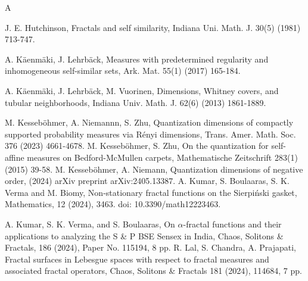 \documentclass{amsproc}
\theoremstyle{definition}
\theoremstyle{remark}
\numberwithin{equation}{section}
\begin{document}
\begin{thebibliography}{A}
 
 J. E. Hutchinson, Fractals and self similarity, Indiana Uni. Math. J. 30(5) (1981) 713-747.
 
   A. K\"aenm\"aki, J. Lehrb\"ack, Measures with predetermined regularity and inhomogeneous self-similar sets, Ark. Mat. 55(1) (2017) 165-184.

   A. Käenmäki, J. Lehrbäck, M. Vuorinen, Dimensions, Whitney covers, and tubular neighborhoods, Indiana Univ. Math. J. 62(6) (2013) 1861-1889. 
  
 
 M. Kesseböhmer, A. Niemannn, S. Zhu, 
Quantization dimensions of compactly supported probability measures via R\'enyi dimensions,
Trans. Amer. Math. Soc. 376 (2023) 4661-4678.
 M. Kesseböhmer, S. Zhu,
On the quantization for self-affine measures on Bedford-McMullen carpets,
Mathematische Zeitschrift  283(1) (2015) 39-58.
 M. Kesseböhmer, A. Niemann, Quantization dimensions of negative order, (2024) arXiv preprint arXiv:2405.13387.
  A. Kumar, S. Boulaaras, S. K. Verma and M. Biomy, Non-stationary fractal functions on the Sierpi\'nski gasket, Mathematics, 12 (2024), 3463. doi: 10.3390/math12223463.

  A. Kumar, S. K. Verma, and S. Boulaaras, On $\alpha$-fractal functions and their applications to analyzing the S \& P BSE Sensex in India, Chaos, Solitons \& Fractals, 186 (2024), Paper No. 115194, 8 pp.
 R. Lal, S. Chandra, A. Prajapati, Fractal surfaces in Lebesgue spaces with respect to fractal measures and associated fractal operators, Chaos, Solitons \& Fractals 181 (2024), 114684, 7 pp.


\end{thebibliography}
\end{document}
